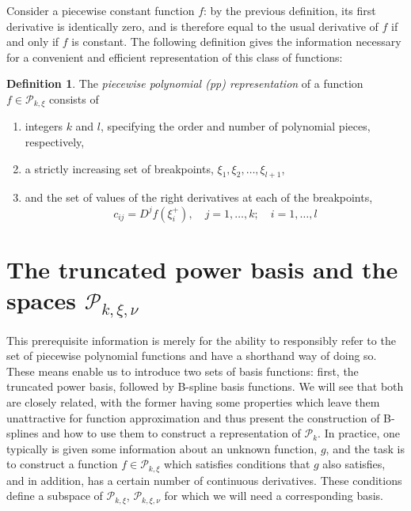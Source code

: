 \documentclass[12pt]{article}
\newcommand{\PP}{\mathcal{P}}
\theoremstyle{definition}
\newtheorem{definition}{Definition}[section]
\begin{document}
Consider a piecewise constant function $f$: by the previous definition, its first derivative is identically zero, and is therefore equal to the usual derivative of $f$ if and only if $f$ is constant. The following definition gives the information necessary for a convenient and efficient representation of this class of functions:

\begin{definition}\label{definition:pp_representation}
The \emph{piecewise polynomial (pp) representation} of a function $f \in \PP_{k,\xi}$ consists of 
\begin{enumerate}
\item integers $k$ and $l$, specifying the order and number of polynomial pieces, respectively,
\item a strictly increasing set of breakpoints, $\xi_1,\xi_2,\dots, \xi_{l+1}$,
\item and the set of values of the right derivatives at each of the breakpoints, 
\[
c_{ij} = D^{j}f\left(\xi_i^+\right), \quad j=1,\dots,k;\quad i=1,\dots,l 
\]
\end{enumerate}
\end{definition} 
 
 \section{The truncated power basis and the spaces $\PP_{k,\xi,\nu}$}
This prerequisite information is merely for the ability to responsibly refer to the set of piecewise polynomial functions and have a shorthand way of doing so. These means enable us to introduce two sets of basis functions: first, the truncated power basis, followed by B-spline basis functions. We will see that both are closely related, with the former having some properties which leave them unattractive for function approximation and thus present the construction of B-splines and how to use them to construct a representation of $\mathcal{P}_{k}$. In practice, one typically is given some information about an unknown function, $g$, and the task is to construct a function $f \in \PP_{k, \xi}$ which satisfies conditions that $g$ also satisfies, and in addition, has a certain number of continuous derivatives. These conditions define a subspace of $\PP_{k,\xi}$, $\PP_{k,\xi, \nu}$ for which we will need a corresponding basis.
\end{document}
